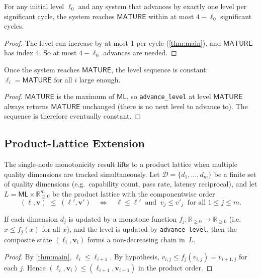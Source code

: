 \documentclass[11pt]{article}
\newcommand{\ML}{\mathsf{ML}}               %
\newcommand{\Matur}{\ensuremath{\mathsf{MATURE}}}
\begin{document}
\begin{corollary}\label{cor:bound}
For any initial level $\ell_0$ and any system that advances by exactly one
level per significant cycle, the system reaches $\Matur$ within at most
$4 - \ell_0$ significant cycles.
\end{corollary}
\begin{proof}
The level can increase by at most 1 per cycle (\cref{thm:main}), and $\Matur$
has index 4.  So at most $4 - \ell_0$ advances are needed.
\end{proof}

\begin{corollary}\label{cor:ss}
Once the system reaches $\Matur$, the level sequence is constant:
$\ell_i = \Matur$ for all $i$ large enough.
\end{corollary}
\begin{proof}
$\Matur$ is the maximum of $\ML$, so \texttt{advance\_level} at level $\Matur$
always returns $\Matur$ unchanged (there is no next level to advance to).
The sequence is therefore eventually constant.
\end{proof}

\subsection{Product-Lattice Extension}

The single-node monotonicity result lifts to a product lattice when
multiple quality dimensions are tracked simultaneously.  Let
$\mathcal{D} = \{d_1, \ldots, d_m\}$ be a finite set of quality dimensions
(e.g.\ capability count, pass rate, latency reciprocal), and let
$L = \ML \times \mathbb{R}_{\geq 0}^{m}$ be the product lattice with the
componentwise order
\[
  (\ell, \mathbf{v}) \;\leq\; (\ell', \mathbf{v}')
  \quad\Longleftrightarrow\quad
  \ell \leq \ell' \;\;\text{and}\;\; v_j \leq v'_j
  \;\;\text{for all } 1 \leq j \leq m.
\]

\begin{proposition}\label{prop:product}
If each dimension $d_j$ is updated by a monotone function
$f_j : \mathbb{R}_{\geq 0} \to \mathbb{R}_{\geq 0}$ (i.e.\
$x \leq f_j(x)$ for all $x$), and the level is updated by
\texttt{advance\_level}, then the composite state
$(\ell_i, \mathbf{v}_i)$ forms a non-decreasing chain in~$L$.
\end{proposition}
\begin{proof}
By \cref{thm:main}, $\ell_i \leq \ell_{i+1}$.  By hypothesis,
$v_{i,j} \leq f_j(v_{i,j}) = v_{i+1,j}$ for each $j$.  Hence
$(\ell_i, \mathbf{v}_i) \leq (\ell_{i+1}, \mathbf{v}_{i+1})$ in the
product order.
\end{proof}
\end{document}
